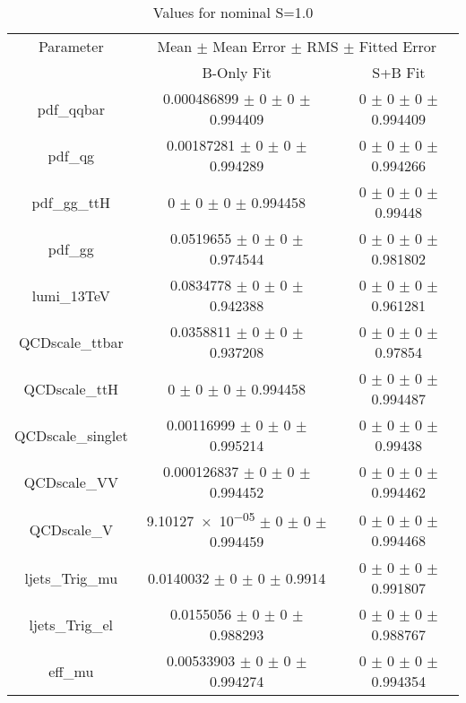 \begin{table}
\centering
\caption{Values for nominal S=1.0}
\begin{tabular}{ccc}
\toprule
Parameter 	& \multicolumn{2}{c}{Mean $\pm$ Mean Error $\pm$ RMS $\pm$ Fitted Error}\\
 	& B-Only Fit & S+B Fit\\
\midrule
pdf\_qqbar 	& \num{0.000486899} $\pm$ \num{0} $\pm$ \num{0} $\pm$ \num{0.994409} 	& \num{0} $\pm$ \num{0} $\pm$ \num{0} $\pm$ \num{0.994409}\\
pdf\_qg 	& \num{0.00187281} $\pm$ \num{0} $\pm$ \num{0} $\pm$ \num{0.994289} 	& \num{0} $\pm$ \num{0} $\pm$ \num{0} $\pm$ \num{0.994266}\\
pdf\_gg\_ttH 	& \num{0} $\pm$ \num{0} $\pm$ \num{0} $\pm$ \num{0.994458} 	& \num{0} $\pm$ \num{0} $\pm$ \num{0} $\pm$ \num{0.99448}\\
pdf\_gg 	& \num{0.0519655} $\pm$ \num{0} $\pm$ \num{0} $\pm$ \num{0.974544} 	& \num{0} $\pm$ \num{0} $\pm$ \num{0} $\pm$ \num{0.981802}\\
lumi\_13TeV 	& \num{0.0834778} $\pm$ \num{0} $\pm$ \num{0} $\pm$ \num{0.942388} 	& \num{0} $\pm$ \num{0} $\pm$ \num{0} $\pm$ \num{0.961281}\\
QCDscale\_ttbar 	& \num{0.0358811} $\pm$ \num{0} $\pm$ \num{0} $\pm$ \num{0.937208} 	& \num{0} $\pm$ \num{0} $\pm$ \num{0} $\pm$ \num{0.97854}\\
QCDscale\_ttH 	& \num{0} $\pm$ \num{0} $\pm$ \num{0} $\pm$ \num{0.994458} 	& \num{0} $\pm$ \num{0} $\pm$ \num{0} $\pm$ \num{0.994487}\\
QCDscale\_singlet 	& \num{0.00116999} $\pm$ \num{0} $\pm$ \num{0} $\pm$ \num{0.995214} 	& \num{0} $\pm$ \num{0} $\pm$ \num{0} $\pm$ \num{0.99438}\\
QCDscale\_VV 	& \num{0.000126837} $\pm$ \num{0} $\pm$ \num{0} $\pm$ \num{0.994452} 	& \num{0} $\pm$ \num{0} $\pm$ \num{0} $\pm$ \num{0.994462}\\
QCDscale\_V 	& \num{9.10127e-05} $\pm$ \num{0} $\pm$ \num{0} $\pm$ \num{0.994459} 	& \num{0} $\pm$ \num{0} $\pm$ \num{0} $\pm$ \num{0.994468}\\
ljets\_Trig\_mu 	& \num{0.0140032} $\pm$ \num{0} $\pm$ \num{0} $\pm$ \num{0.9914} 	& \num{0} $\pm$ \num{0} $\pm$ \num{0} $\pm$ \num{0.991807}\\
ljets\_Trig\_el 	& \num{0.0155056} $\pm$ \num{0} $\pm$ \num{0} $\pm$ \num{0.988293} 	& \num{0} $\pm$ \num{0} $\pm$ \num{0} $\pm$ \num{0.988767}\\
eff\_mu 	& \num{0.00533903} $\pm$ \num{0} $\pm$ \num{0} $\pm$ \num{0.994274} 	& \num{0} $\pm$ \num{0} $\pm$ \num{0} $\pm$ \num{0.994354}\\

\end{tabular}
\end{table}
